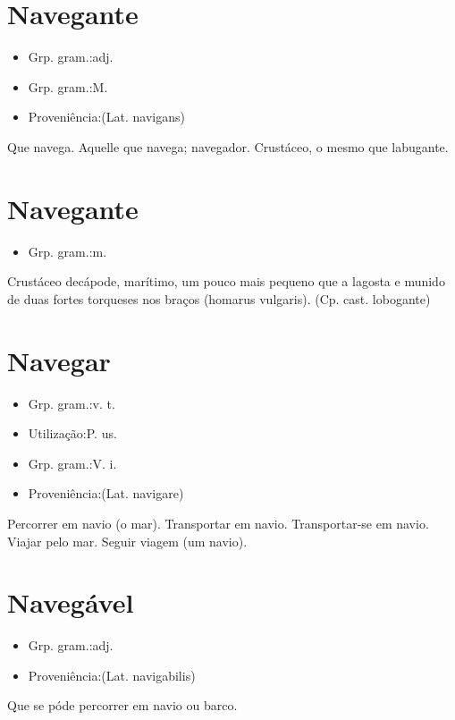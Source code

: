 \section{Navegante}
\begin{itemize}
\item {Grp. gram.:adj.}
\end{itemize}
\begin{itemize}
\item {Grp. gram.:M.}
\end{itemize}
\begin{itemize}
\item {Proveniência:(Lat. \textunderscore navigans\textunderscore )}
\end{itemize}
Que navega.
Aquelle que navega; navegador.
Crustáceo, o mesmo que \textunderscore labugante\textunderscore .
\section{Navegante}
\begin{itemize}
\item {Grp. gram.:m.}
\end{itemize}
Crustáceo decápode, marítimo, um pouco mais pequeno que a lagosta e munido de duas fortes torqueses nos braços (\textunderscore homarus vulgaris\textunderscore ).
(Cp. cast. \textunderscore lobogante\textunderscore )
\section{Navegar}
\begin{itemize}
\item {Grp. gram.:v. t.}
\end{itemize}
\begin{itemize}
\item {Utilização:P. us.}
\end{itemize}
\begin{itemize}
\item {Grp. gram.:V. i.}
\end{itemize}
\begin{itemize}
\item {Proveniência:(Lat. \textunderscore navigare\textunderscore )}
\end{itemize}
Percorrer em navio (o mar).
Transportar em navio.
Transportar-se em navio.
Viajar pelo mar.
Seguir viagem (um navio).
\section{Navegável}
\begin{itemize}
\item {Grp. gram.:adj.}
\end{itemize}
\begin{itemize}
\item {Proveniência:(Lat. \textunderscore navigabilis\textunderscore )}
\end{itemize}
Que se póde percorrer em navio ou barco.
